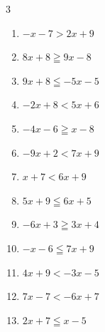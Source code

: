 \begin{multicols}{3}
\begin{enumerate}

\columnbreak %

  \item $-x-7>2x+9$


  \item $8x+8\geqq 9x-8$

        \phantom{$\displaystyle x\leqq 16$}

  \item $9x+8\leqq -5x-5$


  \item $-2x+8<5x+6$


  \item $-4x-6\geqq x-8$


  \item $-9x+2<7x+9$


  \item $x+7<6x+9$


  \item $5x+9\leqq 6x+5$

        \phantom{$\displaystyle x\geqq 4$}

  \item $-6x+3\geqq 3x+4$


  \item $-x-6\leqq 7x+9$


  \item $4x+9<-3x-5$

        \phantom{$\displaystyle x<-2$}

  \item $7x-7<-6x+7$


  \item $2x+7\leqq x-5$

        \phantom{$\displaystyle x\leqq -12$}


\end{enumerate}
\end{multicols}
